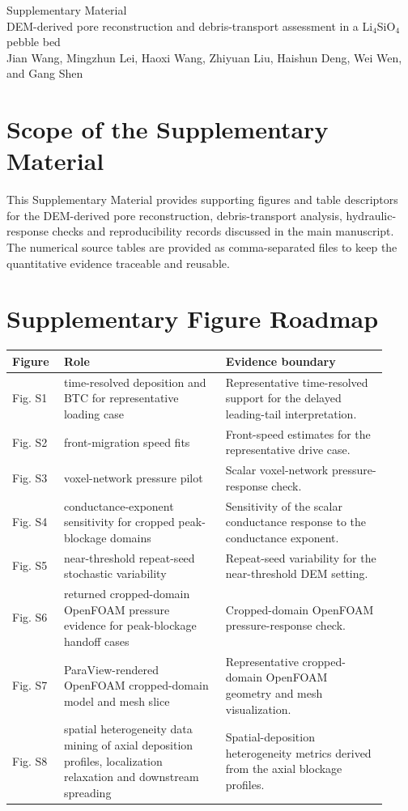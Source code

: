 \documentclass[11pt]{article}
\begin{document}
\begin{center}
{\Large Supplementary Material}\\[0.5em]
{\large DEM-derived pore reconstruction and debris-transport assessment in a Li$_4$SiO$_4$ pebble bed}\\[0.75em]
Jian Wang, Mingzhun Lei, Haoxi Wang, Zhiyuan Liu, Haishun Deng, Wei Wen, and Gang Shen
\end{center}
\section*{Scope of the Supplementary Material}
This Supplementary Material provides supporting figures and table descriptors for the DEM-derived pore reconstruction, debris-transport analysis, hydraulic-response checks and reproducibility records discussed in the main manuscript.
The numerical source tables are provided as comma-separated files to keep the quantitative evidence traceable and reusable.
\section*{Supplementary Figure Roadmap}
\begin{longtable}{P{0.12\linewidth}P{0.40\linewidth}P{0.40\linewidth}}
\toprule
Figure & Role & Evidence boundary \\
\midrule
\endhead
Fig. S1 & time-resolved deposition and BTC for representative loading case & Representative time-resolved support for the delayed leading-tail interpretation. \\
Fig. S2 & front-migration speed fits & Front-speed estimates for the representative drive case. \\
Fig. S3 & voxel-network pressure pilot & Scalar voxel-network pressure-response check. \\
Fig. S4 & conductance-exponent sensitivity for cropped peak-blockage domains & Sensitivity of the scalar conductance response to the conductance exponent. \\
Fig. S5 & near-threshold repeat-seed stochastic variability & Repeat-seed variability for the near-threshold DEM setting. \\
Fig. S6 & returned cropped-domain OpenFOAM pressure evidence for peak-blockage handoff cases & Cropped-domain OpenFOAM pressure-response check. \\
Fig. S7 & ParaView-rendered OpenFOAM cropped-domain model and mesh slice & Representative cropped-domain OpenFOAM geometry and mesh visualization. \\
Fig. S8 & spatial heterogeneity data mining of axial deposition profiles, localization relaxation and downstream spreading & Spatial-deposition heterogeneity metrics derived from the axial blockage profiles. \\
\bottomrule
\end{longtable}
\clearpage
\end{document}
